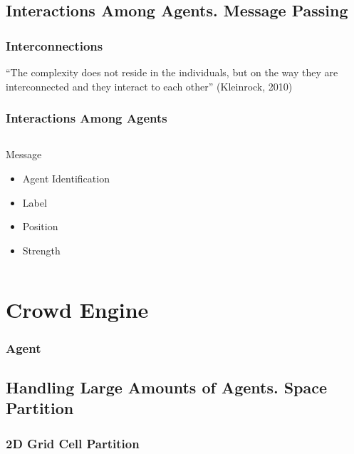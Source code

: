 \documentclass{beamer}
\begin{document}
\subsection{Interactions Among Agents. Message Passing}

\begin{frame}
\frametitle{Interconnections}
\begin{center}
``The complexity does not reside in the individuals, but on the way they are interconnected and they interact to each other'' (Kleinrock, 2010)
\end{center}
\end{frame}

\begin{frame}
\frametitle{Interactions Among Agents}
\begin{center}
\begin{columns}
	\column{4cm}
	\begin{block}{Message}
	\begin{itemize}
	\item Agent Identification
	\item Label
	\item Position
	\item Strength
	\end{itemize}
	\end{block}
	\column{3cm}
\end{columns}
\end{center}
\end{frame}

\section{Crowd Engine}

\begin{frame}
\frametitle{Agent}
\begin{center}
\end{center}
\end{frame}

\subsection{Handling Large Amounts of Agents. Space Partition}

\begin{frame}
\frametitle{2D Grid Cell Partition}
\begin{center}
\end{center}
\end{frame}
\end{document}
